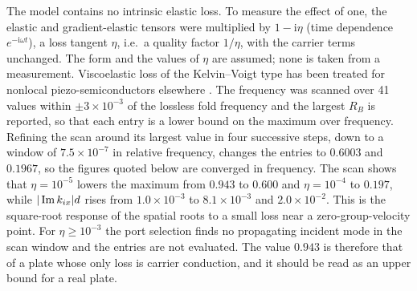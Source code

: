 The model contains no intrinsic elastic loss.  To measure the effect of one, the elastic
and gradient-elastic tensors were multiplied by $1-\mathrm i\eta$ (time dependence $e^{-\mathrm i\omega t}$), a loss tangent $\eta$, i.e.\ a
quality factor $1/\eta$, with the carrier terms unchanged.  The form and the values of $\eta$ are assumed; none is taken from a measurement.  Viscoelastic loss of the Kelvin--Voigt type has been treated for nonlocal piezo-semiconductors elsewhere \cite{gupta2026heatmap}.
The frequency was scanned over 41 values within $\pm3\times10^{-3}$ of the lossless fold frequency and the largest $R_B$ is
reported, so that each entry is a lower bound on the maximum over frequency.  Refining the scan around its largest value in four successive steps, down to a window of $7.5\times10^{-7}$ in relative frequency, changes the entries to $0.6003$ and $0.1967$, so the figures quoted below are converged in frequency.  The scan shows that $\eta=10^{-5}$
lowers the maximum from $0.943$ to $0.600$ and $\eta=10^{-4}$ to $0.197$, while
$|\operatorname{Im} k_{ix}|d$ rises from $1.0\times10^{-3}$ to $8.1\times10^{-3}$ and $2.0\times10^{-2}$.  This is the square-root response of the
spatial roots to a small loss near a zero-group-velocity point.  For $\eta\ge10^{-3}$ the port selection finds no
propagating incident mode in the scan window and the entries are not evaluated.  The value
$0.943$ is therefore that of a plate whose only loss is carrier conduction, and it should be read as an upper bound
for a real plate.

